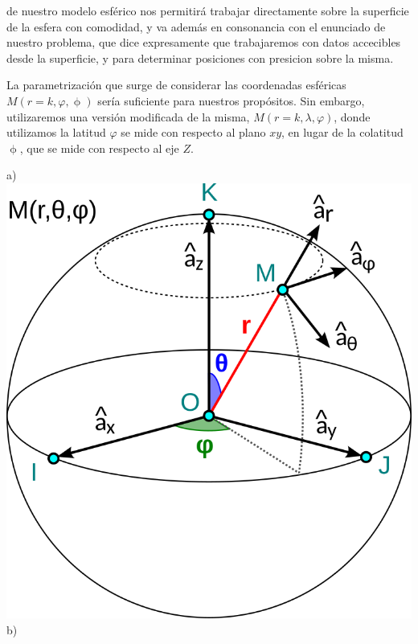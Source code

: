 \documentclass{tufte-book}
\begin{document}
 de nuestro modelo esférico nos permitirá trabajar directamente sobre
la superficie de la esfera con comodidad, y va además en consonancia con el enunciado de nuestro problema,
que dice expresamente que trabajaremos con datos accecibles desde la superficie, y para determinar
posiciones con presicion sobre la misma.

La parametrización que surge de considerar las coordenadas esféricas \(M(r=k,\varphi,\upphi)\) sería
suficiente para nuestros propósitos. Sin embargo, utilizaremos una versión modificada de la misma,
\(M(r=k,\lambda,\varphi)\), donde utilizamos la latitud \(\varphi\) se mide con respecto al
plano \(xy\), en lugar de la colatitud \(\upphi\), que se mide con respecto al eje \(Z\).

\begin{marginfigure}
  \label{fig:esfericas}
  a)
  \includegraphics{./imgs/colatlon.png}
  b)

\end{marginfigure}
\end{document}
